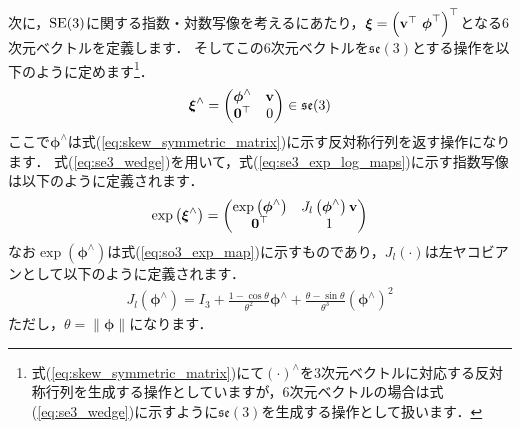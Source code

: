 次に，${\rm SE}(3)$に関する指数・対数写像を考えるにあたり，$\boldsymbol \xi = \left( {\bf v}^{\top} ~ \boldsymbol \phi^{\top} \right)^{\top}$となる6次元ベクトルを定義します．
そしてこの6次元ベクトルを$\mathfrak{se}(3)$とする操作を以下のように定めます\footnote{式(\ref{eq:skew_symmetric_matrix})にて$\left( \cdot \right)^{\wedge}$を3次元ベクトルに対応する反対称行列を生成する操作としていますが，6次元ベクトルの場合は式(\ref{eq:se3_wedge})に示すように$\mathfrak{se}(3)$を生成する操作として扱います．}．
%
\begin{align}
  \boldsymbol \xi^{\wedge} = \left( \begin{matrix}
    \boldsymbol \phi^{\wedge} & {\bf v} \\
    {\bf 0}^{\top}            & 0
  \end{matrix} \right) \in \mathfrak{se}(3)
  \label{eq:se3_wedge}
\end{align}
%
ここで$\boldsymbol \phi^{\wedge}$は式(\ref{eq:skew_symmetric_matrix})に示す反対称行列を返す操作になります．
式(\ref{eq:se3_wedge})を用いて，式(\ref{eq:se3_exp_log_maps})に示す指数写像は以下のように定義されます．
%
\begin{align}
  \exp \left( \boldsymbol \xi^{\wedge} \right) = \left( \begin{matrix}
    \exp \left( \boldsymbol \phi^{\wedge} \right) & J_{l} \left( \boldsymbol \phi^{\wedge} \right) {\bf v} \\
    {\bf 0}^{\top}                                & 1
  \end{matrix} \right)
  \label{eq:se3_exp_map}
\end{align}
%
なお$\exp \left( \boldsymbol \phi^{\wedge} \right)$は式(\ref{eq:so3_exp_map})に示すものであり，$J_{l} \left( \cdot \right)$は左ヤコビアンとして以下のように定義されます．
%
\begin{align}
  J_{l} \left( \boldsymbol \phi^{\wedge} \right)
  =
  I_{3} +
  \frac{ 1 - \cos \theta }{ \theta^{2} } \boldsymbol \phi^{\wedge} +
  \frac{ \theta - \sin \theta }{ \theta^{3} } \left( \boldsymbol \phi^{\wedge} \right)^{2}
  \label{eq:so3_left_jacobian}
\end{align}
%
ただし，$\theta = \| \boldsymbol \phi \|$になります．

